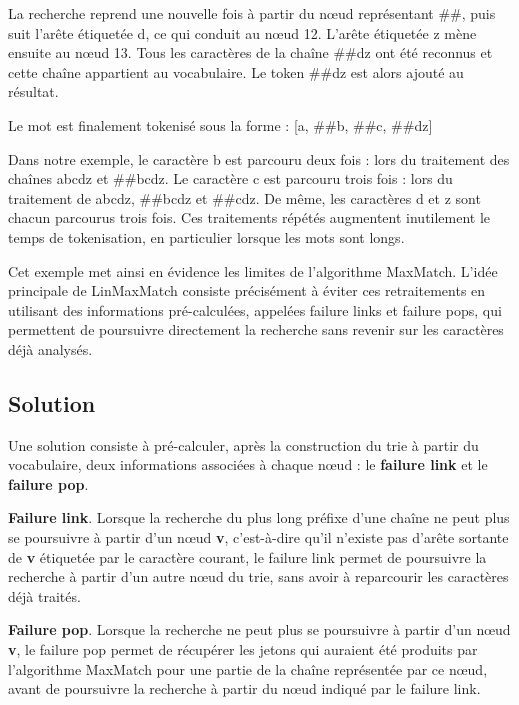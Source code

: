 \documentclass[12pt,a4paper]{report}
\begin{document}
	La recherche reprend une nouvelle fois à partir du nœud représentant \#\#, puis suit l'arête étiquetée d, ce qui conduit au nœud 12. L'arête étiquetée z mène ensuite au nœud 13. Tous les caractères de la chaîne \#\#dz ont été reconnus et cette chaîne appartient au vocabulaire. Le token \#\#dz est alors ajouté au résultat.
	
	Le mot est finalement tokenisé sous la forme : [a, \#\#b, \#\#c, \#\#dz]
	
	Dans notre exemple, le caractère b est parcouru deux fois : lors du traitement des chaînes abcdz et \#\#bcdz. Le caractère c est parcouru trois fois : lors du traitement de abcdz, \#\#bcdz et \#\#cdz. De même, les caractères d et z sont chacun parcourus trois fois. Ces traitements répétés augmentent inutilement le temps de tokenisation, en particulier lorsque les mots sont longs.
	
	Cet exemple met ainsi en évidence les limites de l'algorithme MaxMatch. L'idée principale de LinMaxMatch consiste précisément à éviter ces retraitements en utilisant des informations pré-calculées, appelées failure links et failure pops, qui permettent de poursuivre directement la recherche sans revenir sur les caractères déjà analysés.
	
	\subsection{Solution}
	
	Une solution consiste à pré-calculer, après la construction du trie à partir du vocabulaire, deux informations associées à chaque nœud : le \textbf{failure link} et le \textbf{failure pop}.
	\begin{itemizeFB}
		\item \textbf{Failure link}. Lorsque la recherche du plus long préfixe d'une chaîne ne peut plus se poursuivre à partir d'un nœud \textbf{v}, c'est-à-dire qu'il n'existe pas d'arête sortante de \textbf{v} étiquetée par le caractère courant, le failure link permet de poursuivre la recherche à partir d'un autre nœud du trie, sans avoir à reparcourir les caractères déjà traités.
		\item \textbf{Failure pop}. Lorsque la recherche ne peut plus se poursuivre à partir d'un nœud \textbf{v}, le failure pop permet de récupérer les jetons qui auraient été produits par l'algorithme MaxMatch pour une partie de la chaîne représentée par ce nœud, avant de poursuivre la recherche à partir du nœud indiqué par le failure link.
	\end{itemizeFB}
	
\end{document}
